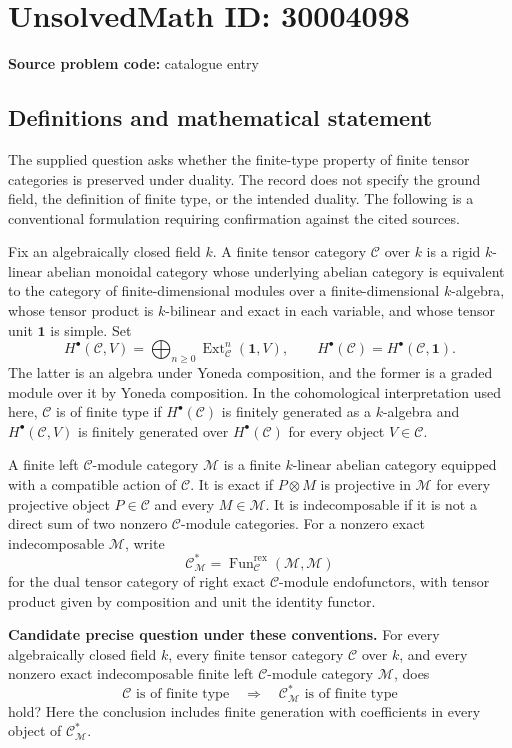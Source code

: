 \documentclass[11pt]{article}
\begin{document}
\section*{UnsolvedMath ID: 30004098}
\textbf{Source problem code:} catalogue entry
\subsection{Definitions and mathematical statement}
The supplied question asks whether the finite-type property of finite tensor categories is preserved under duality. The record does not specify the ground field, the definition of finite type, or the intended duality. The following is a conventional formulation requiring confirmation against the cited sources.

Fix an algebraically closed field \(k\). A finite tensor category \(\mathcal C\) over \(k\) is a rigid \(k\)-linear abelian monoidal category whose underlying abelian category is equivalent to the category of finite-dimensional modules over a finite-dimensional \(k\)-algebra, whose tensor product is \(k\)-bilinear and exact in each variable, and whose tensor unit \(\mathbf 1\) is simple. Set
\[
H^\bullet(\mathcal C,V)=\bigoplus_{n\geq 0}\operatorname{Ext}^n_{\mathcal C}(\mathbf 1,V),
\qquad
H^\bullet(\mathcal C)=H^\bullet(\mathcal C,\mathbf 1).
\]
The latter is an algebra under Yoneda composition, and the former is a graded module over it by Yoneda composition. In the cohomological interpretation used here, \(\mathcal C\) is of finite type if \(H^\bullet(\mathcal C)\) is finitely generated as a \(k\)-algebra and \(H^\bullet(\mathcal C,V)\) is finitely generated over \(H^\bullet(\mathcal C)\) for every object \(V\in\mathcal C\).

A finite left \(\mathcal C\)-module category \(\mathcal M\) is a finite \(k\)-linear abelian category equipped with a compatible action of \(\mathcal C\). It is exact if \(P\otimes M\) is projective in \(\mathcal M\) for every projective object \(P\in\mathcal C\) and every \(M\in\mathcal M\). It is indecomposable if it is not a direct sum of two nonzero \(\mathcal C\)-module categories. For a nonzero exact indecomposable \(\mathcal M\), write
\[
\mathcal C_{\mathcal M}^{*}=\operatorname{Fun}_{\mathcal C}^{\mathrm{rex}}(\mathcal M,\mathcal M)
\]
for the dual tensor category of right exact \(\mathcal C\)-module endofunctors, with tensor product given by composition and unit the identity functor.

\textbf{Candidate precise question under these conventions.} For every algebraically closed field \(k\), every finite tensor category \(\mathcal C\) over \(k\), and every nonzero exact indecomposable finite left \(\mathcal C\)-module category \(\mathcal M\), does
\[
\mathcal C\text{ is of finite type}
\quad\Longrightarrow\quad
\mathcal C_{\mathcal M}^{*}\text{ is of finite type}
\]
hold? Here the conclusion includes finite generation with coefficients in every object of \(\mathcal C_{\mathcal M}^{*}\).
\end{document}
